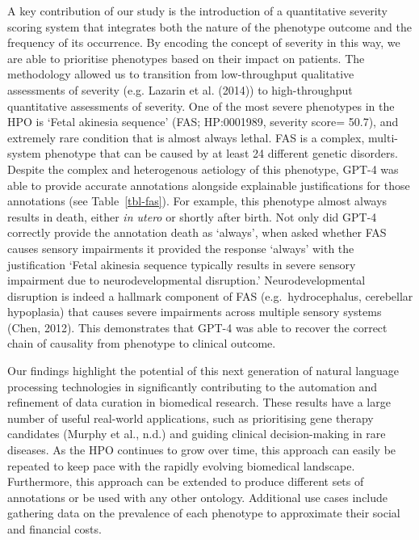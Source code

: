 \documentclass[
]{agujournal2019}
\begin{document}
A key contribution of our study is the introduction of a quantitative
severity scoring system that integrates both the nature of the phenotype
outcome and the frequency of its occurrence. By encoding the concept of
severity in this way, we are able to prioritise phenotypes based on
their impact on patients. The methodology allowed us to transition from
low-throughput qualitative assessments of severity (e.g. Lazarin et al.
(2014)) to high-throughput quantitative assessments of severity. One of
the most severe phenotypes in the HPO is `Fetal akinesia sequence' (FAS;
HP:0001989, severity score= 50.7), and extremely rare condition that is
almost always lethal. FAS is a complex, multi-system phenotype that can
be caused by at least 24 different genetic disorders. Despite the
complex and heterogenous aetiology of this phenotype, GPT-4 was able to
provide accurate annotations alongside explainable justifications for
those annotations (see Table~\ref{tbl-fas}). For example, this phenotype
almost always results in death, either \emph{in utero} or shortly after
birth. Not only did GPT-4 correctly provide the annotation death as
`always', when asked whether FAS causes sensory impairments it provided
the response `always' with the justification `Fetal akinesia sequence
typically results in severe sensory impairment due to neurodevelopmental
disruption.' Neurodevelopmental disruption is indeed a hallmark
component of FAS (e.g.~hydrocephalus, cerebellar hypoplasia) that causes
severe impairments across multiple sensory systems (Chen, 2012). This
demonstrates that GPT-4 was able to recover the correct chain of
causality from phenotype to clinical outcome.

Our findings highlight the potential of this next generation of natural
language processing technologies in significantly contributing to the
automation and refinement of data curation in biomedical research. These
results have a large number of useful real-world applications, such as
prioritising gene therapy candidates (Murphy et al., n.d.) and guiding
clinical decision-making in rare diseases. As the HPO continues to grow
over time, this approach can easily be repeated to keep pace with the
rapidly evolving biomedical landscape. Furthermore, this approach can be
extended to produce different sets of annotations or be used with any
other ontology. Additional use cases include gathering data on the
prevalence of each phenotype to approximate their social and financial
costs.
\end{document}

